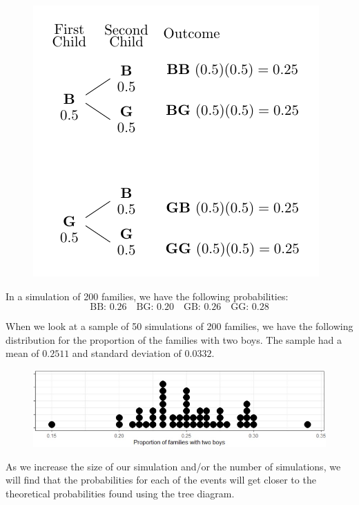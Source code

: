 \documentclass[
]{book}
\theoremstyle{definition}
\theoremstyle{definition}
\theoremstyle{definition}
\theoremstyle{definition}
\theoremstyle{remark}
\begin{document}
\begin{figure}

{\centering \includegraphics[width=0.45\linewidth]{tikz/birth_tree_two} 

}

\end{figure}

In a simulation of 200 families, we have the following probabilities:
\[\mbox{BB: } 0.26 \quad \mbox{BG: } 0.20 \quad \mbox{GB: } 0.26 \quad \mbox{GG: } 0.28\]

When we look at a sample of 50 simulations of 200 families, we have the following distribution for the proportion of the families with two boys. The sample had a mean of \(0.2511\) and standard deviation of \(0.0332\).

\begin{figure}

{\centering \includegraphics[width=0.9\linewidth]{images/birth_sim_prop} 

}

\end{figure}

As we increase the size of our simulation and/or the number of simulations, we will find that the probabilities for each of the events will get closer to the theoretical probabilities found using the tree diagram.
\end{document}
